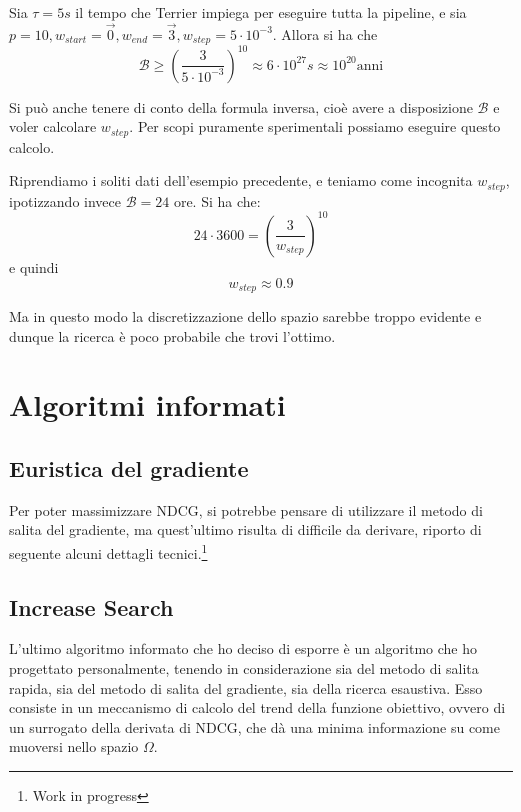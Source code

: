 \begin{esempio}\label{ex:gsspace}
	Sia $\tau = 5s$ il tempo che Terrier impiega per eseguire tutta la pipeline, e sia $p=10, w_{start} = \vec{0}, w_{end} = \vec{3}, w_{step} = 5 \cdot 10^{-3}$.
	Allora si ha che
	$$
	\mathcal{B} \geq \left(\frac{3}{5 \cdot 10^{-3}}\right)^{10} \approx 6 \cdot 10^{27}s \approx 10^{20} \text{anni}
	$$
\end{esempio}


\begin{esempio}
	Si può anche tenere di conto della formula inversa, cioè avere a disposizione $\mathcal{B}$ e voler
	calcolare $w_{step}$. Per scopi puramente sperimentali possiamo eseguire questo calcolo.
	
	Riprendiamo i soliti dati dell'esempio precedente, e teniamo come incognita $w_{step}$, ipotizzando
	invece $\mathcal{B} = 24$ ore.
	Si ha che:
	$$
	24 \cdot 3600 = \left(\frac{3}{w_{step}}\right)^{10}
	$$
	e quindi
	$$
	w_{step} \approx 0.9
	$$
	
	Ma in questo modo la discretizzazione dello spazio sarebbe troppo evidente e dunque la ricerca è poco
	probabile che trovi l'ottimo.
\end{esempio}

\section{Algoritmi informati}

\subsection{Euristica del gradiente}
Per poter massimizzare NDCG, si potrebbe pensare di utilizzare il metodo di salita del gradiente,
ma quest'ultimo risulta di difficile da derivare, riporto di seguente alcuni dettagli tecnici.\footnote{Work in progress}

\subsection{Increase Search}
L'ultimo algoritmo informato che ho deciso di esporre è un algoritmo che ho
progettato personalmente, tenendo in considerazione sia del metodo di salita rapida,
sia del metodo di salita del gradiente,
sia della ricerca esaustiva. Esso consiste in un meccanismo di calcolo del trend della funzione obiettivo,
ovvero di un surrogato della derivata di NDCG, che dà una minima informazione su come
muoversi nello spazio $\Omega$.


